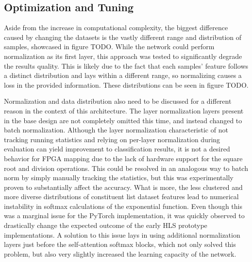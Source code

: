 \subsection{Optimization and Tuning}
Aside from the increase in computational complexity, the biggest difference caused by changing the datasets is the vastly different range and distribution of samples, showcased in figure TODO. While the network could perform normalization as its first layer, this approach was tested to significantly degrade the results quality. This is likely due to the fact that each samples' feature follows a distinct distribution and lays within a different range, so normalizing causes a loss in the provided information. These distributions can be seen in figure TODO. 

Normalization and data distribution also need to be discussed for a different reason in the context of this architecture. The layer normalization layers present in the base design are not completely omitted this time, and instead changed to batch normalization. Although the layer normalization characteristic of not tracking running statistics and relying on per-layer normalization during evaluation can yield improvement to classification results, it is not a desired behavior for FPGA mapping due to the lack of hardware support for the square root and division operations. This could be resolved in an analogous way to batch norm by simply manually tracking the statistics, but this was experimentally proven to substantially affect the accuracy. What is more, the less clustered and more diverse distributions of constituent list dataset features lead to numerical instability in softmax calculations of the exponential function. Even though this was a marginal issue for the PyTorch implementation, it was quickly observed to drastically change the expected outcome of the early HLS prototype implementations. A solution to this issue lays in using additional normalization layers just before the self-attention softmax blocks, which not only solved this problem, but also very slightly increased the learning capacity of the network.

\todofig{|}
\todofig{|}
\todofig{|}
\todofig{|}
\todofig{|}
\todofig{|}

